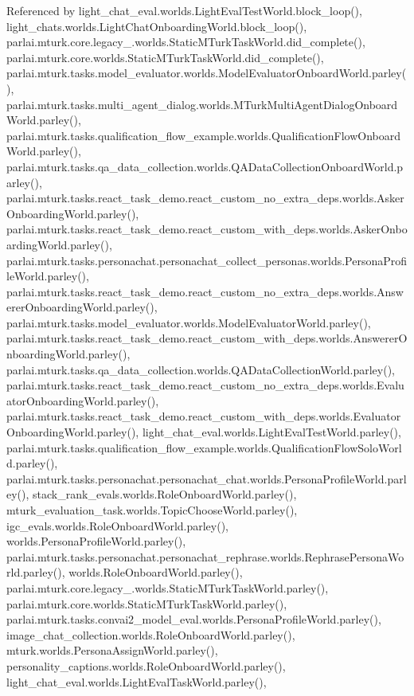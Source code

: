 Referenced by light\+\_\+chat\+\_\+eval.\+worlds.\+Light\+Eval\+Test\+World.\+block\+\_\+loop(), light\+\_\+chats.\+worlds.\+Light\+Chat\+Onboarding\+World.\+block\+\_\+loop(), parlai.\+mturk.\+core.\+legacy\+\_.\+worlds.\+Static\+M\+Turk\+Task\+World.\+did\+\_\+complete(), parlai.\+mturk.\+core.\+worlds.\+Static\+M\+Turk\+Task\+World.\+did\+\_\+complete(), parlai.\+mturk.\+tasks.\+model\+\_\+evaluator.\+worlds.\+Model\+Evaluator\+Onboard\+World.\+parley(), parlai.\+mturk.\+tasks.\+multi\+\_\+agent\+\_\+dialog.\+worlds.\+M\+Turk\+Multi\+Agent\+Dialog\+Onboard\+World.\+parley(), parlai.\+mturk.\+tasks.\+qualification\+\_\+flow\+\_\+example.\+worlds.\+Qualification\+Flow\+Onboard\+World.\+parley(), parlai.\+mturk.\+tasks.\+qa\+\_\+data\+\_\+collection.\+worlds.\+Q\+A\+Data\+Collection\+Onboard\+World.\+parley(), parlai.\+mturk.\+tasks.\+react\+\_\+task\+\_\+demo.\+react\+\_\+custom\+\_\+no\+\_\+extra\+\_\+deps.\+worlds.\+Asker\+Onboarding\+World.\+parley(), parlai.\+mturk.\+tasks.\+react\+\_\+task\+\_\+demo.\+react\+\_\+custom\+\_\+with\+\_\+deps.\+worlds.\+Asker\+Onboarding\+World.\+parley(), parlai.\+mturk.\+tasks.\+personachat.\+personachat\+\_\+collect\+\_\+personas.\+worlds.\+Persona\+Profile\+World.\+parley(), parlai.\+mturk.\+tasks.\+react\+\_\+task\+\_\+demo.\+react\+\_\+custom\+\_\+no\+\_\+extra\+\_\+deps.\+worlds.\+Answerer\+Onboarding\+World.\+parley(), parlai.\+mturk.\+tasks.\+model\+\_\+evaluator.\+worlds.\+Model\+Evaluator\+World.\+parley(), parlai.\+mturk.\+tasks.\+react\+\_\+task\+\_\+demo.\+react\+\_\+custom\+\_\+with\+\_\+deps.\+worlds.\+Answerer\+Onboarding\+World.\+parley(), parlai.\+mturk.\+tasks.\+qa\+\_\+data\+\_\+collection.\+worlds.\+Q\+A\+Data\+Collection\+World.\+parley(), parlai.\+mturk.\+tasks.\+react\+\_\+task\+\_\+demo.\+react\+\_\+custom\+\_\+no\+\_\+extra\+\_\+deps.\+worlds.\+Evaluator\+Onboarding\+World.\+parley(), parlai.\+mturk.\+tasks.\+react\+\_\+task\+\_\+demo.\+react\+\_\+custom\+\_\+with\+\_\+deps.\+worlds.\+Evaluator\+Onboarding\+World.\+parley(), light\+\_\+chat\+\_\+eval.\+worlds.\+Light\+Eval\+Test\+World.\+parley(), parlai.\+mturk.\+tasks.\+qualification\+\_\+flow\+\_\+example.\+worlds.\+Qualification\+Flow\+Solo\+World.\+parley(), parlai.\+mturk.\+tasks.\+personachat.\+personachat\+\_\+chat.\+worlds.\+Persona\+Profile\+World.\+parley(), stack\+\_\+rank\+\_\+evals.\+worlds.\+Role\+Onboard\+World.\+parley(), mturk\+\_\+evaluation\+\_\+task.\+worlds.\+Topic\+Choose\+World.\+parley(), igc\+\_\+evals.\+worlds.\+Role\+Onboard\+World.\+parley(), worlds.\+Persona\+Profile\+World.\+parley(), parlai.\+mturk.\+tasks.\+personachat.\+personachat\+\_\+rephrase.\+worlds.\+Rephrase\+Persona\+World.\+parley(), worlds.\+Role\+Onboard\+World.\+parley(), parlai.\+mturk.\+core.\+legacy\+\_.\+worlds.\+Static\+M\+Turk\+Task\+World.\+parley(), parlai.\+mturk.\+core.\+worlds.\+Static\+M\+Turk\+Task\+World.\+parley(), parlai.\+mturk.\+tasks.\+convai2\+\_\+model\+\_\+eval.\+worlds.\+Persona\+Profile\+World.\+parley(), image\+\_\+chat\+\_\+collection.\+worlds.\+Role\+Onboard\+World.\+parley(), mturk.\+worlds.\+Persona\+Assign\+World.\+parley(), personality\+\_\+captions.\+worlds.\+Role\+Onboard\+World.\+parley(), light\+\_\+chat\+\_\+eval.\+worlds.\+Light\+Eval\+Task\+World.\+parley(), 